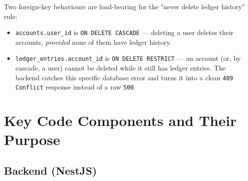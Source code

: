 \documentclass[11pt]{article}
\begin{document}
\begin{center}
\end{center}

Two foreign-key behaviours are load-bearing for the "never delete ledger
history" rule:

\begin{itemize}[nosep]
    \item \texttt{accounts.user\_id} is \texttt{ON DELETE CASCADE} ---
    deleting a user deletes their accounts, \emph{provided} none of them
    have ledger history.
    \item \texttt{ledger\_entries.account\_id} is \texttt{ON DELETE
    RESTRICT} --- an account (or, by cascade, a user) cannot be deleted
    while it still has ledger entries. The backend catches this specific
    database error and turns it into a clean \texttt{409 Conflict}
    response instead of a raw \texttt{500}.
\end{itemize}

\section{Key Code Components and Their Purpose}

\subsection{Backend (NestJS)}
\end{document}
